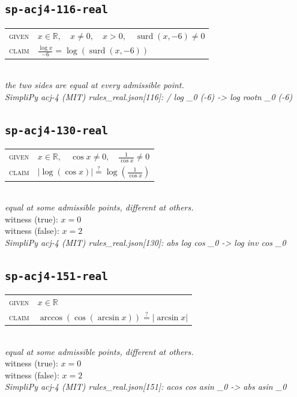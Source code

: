 \documentclass[11pt]{article}
\begin{document}
\subsection*{\texttt{sp-acj4-116-real}}
\begin{tabular}{@{}l@{\quad}l@{}}
\textsc{given} & $x \in \mathbb{R},\quad x \neq 0,\quad x > 0,\quad \operatorname{surd}\left(x, -6\right) \neq 0$ \\[4pt]
\textsc{claim} & $\displaystyle \frac{\log x}{-6} = \log\left(\operatorname{surd}\left(x, -6\right)\right)$ \\
\end{tabular}\\[2pt]
{\small\emph{the two sides are equal at every admissible point.}}\\
\emph{SimpliPy acj-4 (MIT) rules\_real.json[116]: / log \_0 (-6)  ->  log rootn \_0 (-6)}\\

\subsection*{\texttt{sp-acj4-130-real}}
\begin{tabular}{@{}l@{\quad}l@{}}
\textsc{given} & $x \in \mathbb{R},\quad \cos x \neq 0,\quad \frac{1}{\cos x} \neq 0$ \\[4pt]
\textsc{claim} & $\displaystyle \left|\log\left(\cos x\right)\right| \overset{?}{=} \log\left(\frac{1}{\cos x}\right)$ \\
\end{tabular}\\[2pt]
{\small\emph{equal at some admissible points, different at others.}}\\
{\footnotesize\color{gray}witness (true): $x = 0$}\\
{\footnotesize\color{gray}witness (false): $x = 2$}\\
\emph{SimpliPy acj-4 (MIT) rules\_real.json[130]: abs log cos \_0  ->  log inv cos \_0}\\

\subsection*{\texttt{sp-acj4-151-real}}
\begin{tabular}{@{}l@{\quad}l@{}}
\textsc{given} & $x \in \mathbb{R}$ \\[4pt]
\textsc{claim} & $\displaystyle \arccos\left(\cos\left(\arcsin x\right)\right) \overset{?}{=} \left|\arcsin x\right|$ \\
\end{tabular}\\[2pt]
{\small\emph{equal at some admissible points, different at others.}}\\
{\footnotesize\color{gray}witness (true): $x = 0$}\\
{\footnotesize\color{gray}witness (false): $x = 2$}\\
\emph{SimpliPy acj-4 (MIT) rules\_real.json[151]: acos cos asin \_0  ->  abs asin \_0}\\
\end{document}
